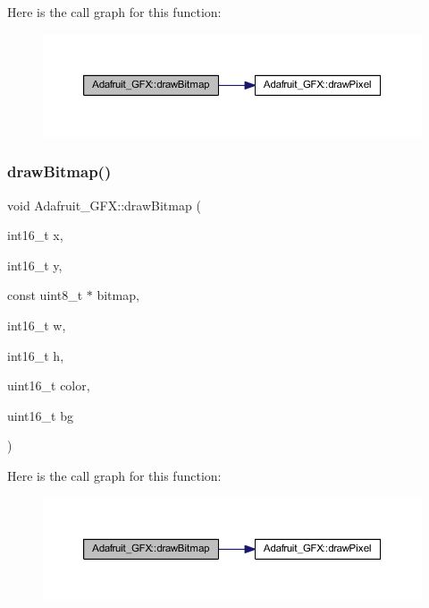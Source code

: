 Here is the call graph for this function\+:
\nopagebreak
\begin{figure}[H]
\begin{center}
\leavevmode
\includegraphics[width=350pt]{d9/d97/class_adafruit___g_f_x_a50bf54503493152eeefa36f9768acec2_cgraph}
\end{center}
\end{figure}
\mbox{\label{class_adafruit___g_f_x_a5225478b3f2afefcb16ed03e9fe93dc0}} 
\subsubsection{\texorpdfstring{draw\+Bitmap()}{drawBitmap()}\hspace{0.1cm}{\footnotesize\ttfamily [2/2]}}
{\footnotesize\ttfamily void Adafruit\+\_\+\+G\+F\+X\+::draw\+Bitmap (\begin{DoxyParamCaption}\item[{int16\+\_\+t}]{x,  }\item[{int16\+\_\+t}]{y,  }\item[{const uint8\+\_\+t $\ast$}]{bitmap,  }\item[{int16\+\_\+t}]{w,  }\item[{int16\+\_\+t}]{h,  }\item[{uint16\+\_\+t}]{color,  }\item[{uint16\+\_\+t}]{bg }\end{DoxyParamCaption})}

Here is the call graph for this function\+:
\nopagebreak
\begin{figure}[H]
\begin{center}
\leavevmode
\includegraphics[width=350pt]{d9/d97/class_adafruit___g_f_x_a5225478b3f2afefcb16ed03e9fe93dc0_cgraph}
\end{center}
\end{figure}
\mbox{\label{class_adafruit___g_f_x_ab7f5a29b3a3dffe30c6a3f4c1f604a5a}} 
